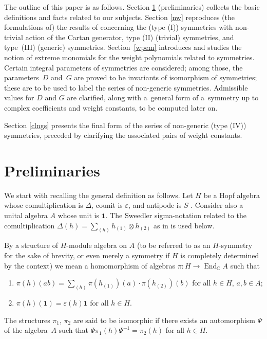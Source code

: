 \documentclass[pdftex]{sigma}
\numberwithin{equation}{section}
\begin{document}
The outline of this paper is as follows. Section \ref{prel} (preliminaries) collects the basic definitions and facts related to our subjects. Section \ref{nw} reproduces (the formulations of) the results of \cite{S} concerning the (type (I)) symmetries with non-trivial action of the Cartan generator, type (II) (trivial) symmetries, and type~(III) (generic) symmetries. Section~\ref{wpem} introduces and studies the notion of extreme monomials for the weight polynomials related to symmetries. Certain integral parameters of symmetries are considered; among those, the parameters~$D$ and~$G$ are proved to be invariants of isomorphism of symmetries; these are to be used to label the series of non-generic symmetries. Admissible values for $D$ and $G$ are clarified, along with a~general form of a~symmetry up to complex coefficients and weight constants, to be computed later on.

Section \ref{clngs} presents the final form of the series of non-generic (type (IV)) symmetries, preceded by clarifying the associated pairs of weight constants.

\section{Preliminaries}\label{prel}

We start with recalling the general definition as follows. Let $H$ be a Hopf algebra whose comultiplication is $\Delta$, counit is $\varepsilon$, and antipode is $S$ \cite{abe}. Consider also a unital algebra $A$ whose unit is $\mathbf{1}$. The Sweedler sigma-notation related to the comultiplication $\Delta(h)=\sum\limits_{(h)}h_{(1)}\otimes h_{(2)}$ as in \cite{sweedler} is used below.

\begin{Definition}\label{symdef}
By a structure of $H$-module algebra on $A$ (to be referred to as an $H$-symmetry for the sake of brevity, or even merely a symmetry if $H$ is completely determined by the context) we mean a homomorphism of algebras $\pi\colon H\to\operatorname{End}_\mathbb{C}A$ such that
\begin{enumerate}\itemsep=0pt\samepage
\item[(i)] $\pi(h)(ab)=\sum\limits_{(h)}\pi(h_{(1)})(a)\cdot\pi(h_{(2)})(b)$ for all $h\in H$, $a,b\in A$;
\item[(ii)] $\pi(h)(\mathbf{1})=\varepsilon(h)\mathbf{1}$ for all $h\in H$.
\end{enumerate}
The structures $\pi_1$, $\pi_2$ are said to be isomorphic if there exists an automorphism $\Psi$ of the algebra~$A$ such that $\Psi\pi_1(h)\Psi^{-1}=\pi_2(h)$ for all $h\in H$.
\end{Definition}
\end{document}
